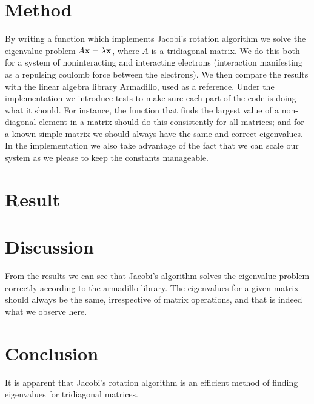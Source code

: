 \section{Method}
	By writing a function which implements Jacobi's rotation algorithm we solve the eigenvalue problem $A\vb{x} = \lambda \vb{x}$, where $A$ is a tridiagonal matrix. We do this both for a system of noninteracting and interacting electrons (interaction manifesting as a repulsing coulomb force between the electrons). We then compare the results with the linear algebra library Armadillo, used as a reference. Under the implementation we introduce tests to make sure each part of the code is doing what it should. For instance, the function that finds the largest value of a non-diagonal element in a matrix should do this consistently for all matrices; and for a known simple matrix we should always have the same and correct eigenvalues. In the implementation we also take advantage of the fact that we can scale our system as we please to keep the constants manageable.
















\section{Result}
















\section{Discussion}
From the results we can see that Jacobi's algorithm solves the eigenvalue problem correctly according to the armadillo library. The eigenvalues for a given matrix should always be the same, irrespective of matrix operations, and that is indeed what we observe here. 


















\section{Conclusion}
It is apparent that Jacobi's rotation algorithm is an efficient method of finding eigenvalues for tridiagonal matrices.





















